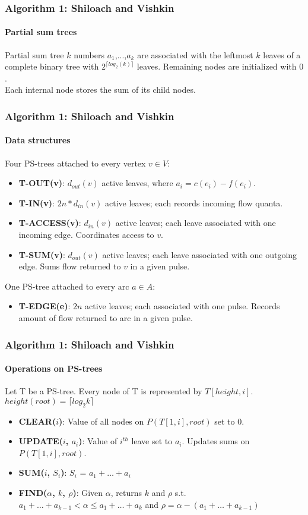 \documentclass{beamer}
\begin{document}
\begin{frame}
\frametitle{Algorithm 1: Shiloach and Vishkin}
\framesubtitle{Partial sum trees} 
\begin{block}{Partial sum tree}
$k$ numbers $a_1$,...,$a_k$ are associated with the leftmost $k$ leaves of a complete binary tree with $2^{\lceil log_2(k) \rceil}$ leaves. Remaining nodes are initialized with $0$. \\
Each internal node stores the sum of its child nodes.
\end{block}
\end{frame}

\begin{frame}
\frametitle{Algorithm 1: Shiloach and Vishkin}
\framesubtitle{Data structures} 
Four PS-trees attached to every vertex $v\in V$:
\begin{itemize}
	\item \textbf{T-OUT(v)}: $d_{out}(v)$ active leaves, where $a_i=c(e_i)-f(e_i)$.
	\item \textbf{T-IN(v)}: $2n*d_{in}(v)$ active leaves; each records incoming flow quanta.
	\item \textbf{T-ACCESS(v)}: $d_{in}(v)$ active leaves; each leave associated with one incoming edge. Coordinates access to $v$. 
	\item \textbf{T-SUM(v)}: $d_{out}(v)$ active leaves; each leave associated with one outgoing edge. Sums flow returned to $v$ in a given pulse. 
\end{itemize}
One PS-tree attached to every arc $a\in A$:
\begin{itemize}
	\item \textbf{T-EDGE(e)}: $2n$ active leaves; each associated with one pulse. Records amount of flow returned to arc in a given pulse.
\end{itemize}
\end{frame}

\begin{frame}
\frametitle{Algorithm 1: Shiloach and Vishkin}
\framesubtitle{Operations on PS-trees}
Let T be a PS-tree. Every node of T is represented by $T[height,i]$. $height(root) = \lceil log_2 k \rceil$
\begin{itemize}
	\item \textbf{CLEAR($i$)}: Value of all nodes on $P(T[1,i],root)$ set to 0.
	\item \textbf{UPDATE($i$, $a_i$)}:  Value of $i^{th}$ leave set to $a_i$. Updates sums on $P(T[1,i],root)$.
	\item \textbf{SUM($i$, $S_i$)}: $S_i$ = $a_1+\ldots +a_i$ 
	\item \textbf{FIND($\alpha$, $k$, $\rho$)}: Given $\alpha$, returns $k$ and $\rho$ s.t.
	$a_1+\ldots +a_{k-1} < \alpha \leq a_1+\ldots +a_k$ and
	$\rho = \alpha - (a_1+\ldots +a_{k-1})$
\end{itemize}
\end{frame}
\end{document}
